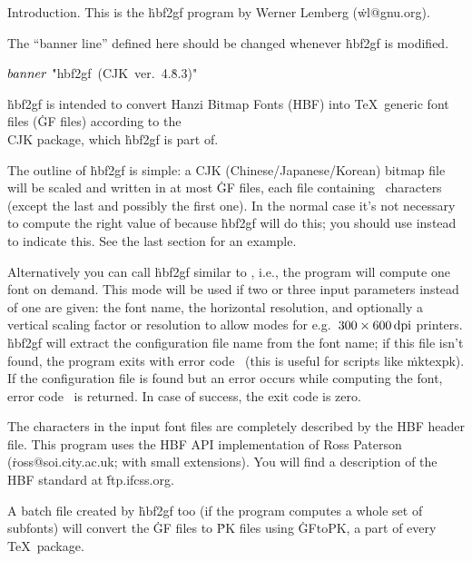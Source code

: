 \def\msdos{\.{msdos}}





Introduction.
This is the \.{hbf2gf} program by Werner Lemberg
(\.{wl@gnu.org}).

The ``banner line'' defined here should be changed whenever \.{hbf2gf} is
modified.

\Y\B\4\D$\\{banner}$ \5
\.{"hbf2gf\ (CJK\ ver.\ 4.}\)\.{8.3)"}\par
\fi

\.{hbf2gf} is intended to convert Hanzi Bitmap Fonts (HBF) into \TeX\
generic font files (\.{GF} files) according to the \\{CJK} package, which
\.{hbf2gf} is part of.

The outline of \.{hbf2gf} is simple: a CJK (Chinese/Japanese/Korean) bitmap
file will be scaled and written in at most \PB{\\{nmb\_files}} \.{GF} files,
each
file containing ~characters (except the last and possibly the first
one). In the normal case it's not necessary to compute the right value of
\PB{\\{nmb\_files}} because \.{hbf2gf} will do this; you should use \PB{${-}%
\T{1}$} instead to
indicate this. See the last section for an example.

Alternatively you can call \.{hbf2gf} similar to \mf, i.e., the program will
compute one font on demand. This mode will be used if two or three input
parameters instead of one are given: the font name, the horizontal
resolution, and optionally a vertical scaling factor or resolution to allow
modes for e.g.\ $300\times600\,\hbox{dpi}$ printers. \.{hbf2gf} will extract
the configuration file name from the font name; if this file isn't found,
the program exits with error code~\PB{\T{2}} (this is useful for scripts like
\.{mktexpk}). If the configuration file is found but an error occurs while
computing the font, error code~\PB{\T{1}} is returned. In case of success, the
exit
code is zero.

The characters in the input font files are completely described by the HBF
header file. This program uses the HBF API implementation of Ross Paterson
(\.{ross@soi.city.ac.uk}; with small extensions). You will find a
description of the HBF standard at \.{ftp.ifcss.org}.

A batch file created by \.{hbf2gf} too (if the program computes a whole set
of subfonts) will convert the \.{GF} files to \.{PK} files using
\.{GFtoPK}, a part of every \TeX\ package.

